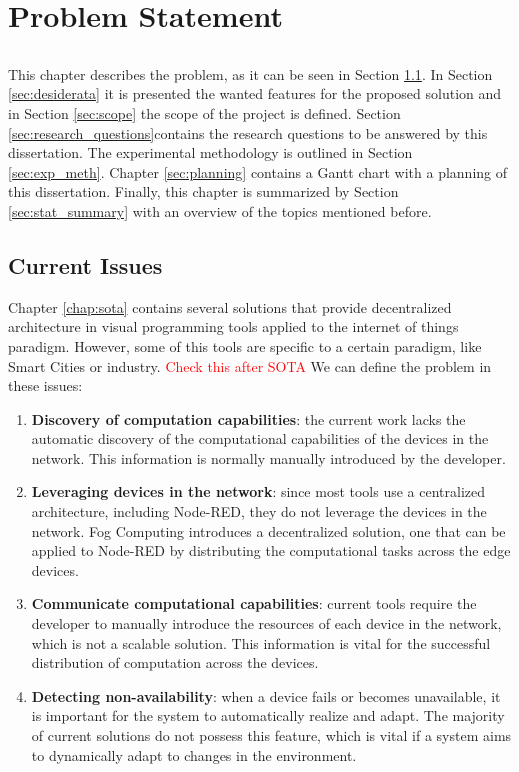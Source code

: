 \chapter{Problem Statement} \label{chap:problem_statement} \minitoc

\section*{}

This chapter describes the problem, as it can be seen in Section \ref{sec:current_issues}. In Section \ref{sec:desiderata} it is presented the wanted features for the proposed solution and in Section \ref{sec:scope} the scope of the project is defined. Section \ref{sec:research_questions}contains the research questions to be answered by this dissertation. The experimental methodology is outlined in Section \ref{sec:exp_meth}. Chapter \ref{sec:planning} contains a Gantt chart with a planning of this dissertation. Finally, this chapter is summarized by Section \ref{sec:stat_summary} with an overview of the topics mentioned before.

\section{Current Issues}\label{sec:current_issues}

Chapter \ref{chap:sota} contains several solutions that provide decentralized architecture in visual programming tools applied to the internet of things paradigm. However, some of this tools are specific to a certain paradigm, like Smart Cities or industry. \textcolor{red}{Check this after SOTA}
We can define the problem in these issues:
\begin{enumerate}
    \item \textbf{Discovery of computation capabilities}: the current work lacks the automatic discovery of the computational capabilities of the devices in the network. This information is normally manually introduced by the developer.
    \item \textbf{Leveraging devices in the network}: since most tools use a centralized architecture, including Node-RED, they do not leverage the devices in the network. Fog Computing introduces a decentralized solution, one that can be applied to Node-RED by distributing the computational tasks across the edge devices.
    \item \textbf{Communicate computational capabilities}: current tools require the developer to manually introduce the resources of each device in the network, which is not a scalable solution. This information is vital for the successful distribution of computation across the devices.
    \item \textbf{Detecting non-availability}: when a device fails or becomes unavailable, it is important for the system to automatically realize and adapt. The majority of current solutions do not possess this feature, which is vital if a system aims to dynamically adapt to changes in the environment.
\end{enumerate}

